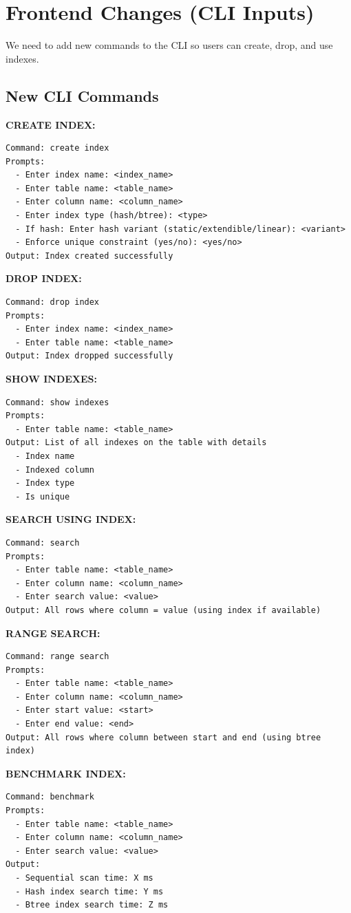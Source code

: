 \documentclass[11pt,a4paper]{article}
\begin{document}
\section{Frontend Changes (CLI Inputs)}

We need to add new commands to the CLI so users can create, drop, and use indexes.

\subsection{New CLI Commands}

\textbf{CREATE INDEX:}
\begin{lstlisting}
Command: create index
Prompts:
  - Enter index name: <index_name>
  - Enter table name: <table_name>
  - Enter column name: <column_name>
  - Enter index type (hash/btree): <type>
  - If hash: Enter hash variant (static/extendible/linear): <variant>
  - Enforce unique constraint (yes/no): <yes/no>
Output: Index created successfully
\end{lstlisting}

\textbf{DROP INDEX:}
\begin{lstlisting}
Command: drop index
Prompts:
  - Enter index name: <index_name>
  - Enter table name: <table_name>
Output: Index dropped successfully
\end{lstlisting}

\textbf{SHOW INDEXES:}
\begin{lstlisting}
Command: show indexes
Prompts:
  - Enter table name: <table_name>
Output: List of all indexes on the table with details
  - Index name
  - Indexed column
  - Index type
  - Is unique
\end{lstlisting}

\textbf{SEARCH USING INDEX:}
\begin{lstlisting}
Command: search
Prompts:
  - Enter table name: <table_name>
  - Enter column name: <column_name>
  - Enter search value: <value>
Output: All rows where column = value (using index if available)
\end{lstlisting}

\textbf{RANGE SEARCH:}
\begin{lstlisting}
Command: range search
Prompts:
  - Enter table name: <table_name>
  - Enter column name: <column_name>
  - Enter start value: <start>
  - Enter end value: <end>
Output: All rows where column between start and end (using btree index)
\end{lstlisting}

\textbf{BENCHMARK INDEX:}
\begin{lstlisting}
Command: benchmark
Prompts:
  - Enter table name: <table_name>
  - Enter column name: <column_name>
  - Enter search value: <value>
Output: 
  - Sequential scan time: X ms
  - Hash index search time: Y ms
  - Btree index search time: Z ms
\end{lstlisting}
\end{document}
